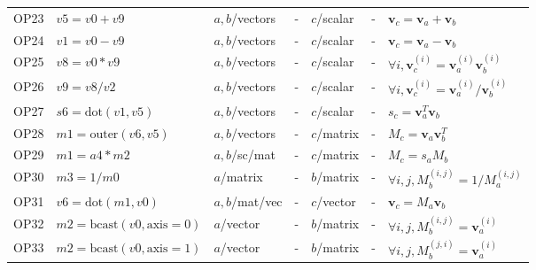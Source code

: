 \documentclass[11pt,oneside,openany,report]{jsbook}
\begin{document}
\begin{center}
{{\begin{longtable}{l|l|lc|lc|l}
        OP23 & $v5 = v0 + v9$                             & $a,b$/vectors           & -               & $c$/scalar & -     & $\bm{v}_c = \bm{v}_a + \bm{v}_b$                                               \\
        OP24 & $v1 = v0 - v9$                             & $a,b$/vectors           & -               & $c$/scalar & -     & $\bm{v}_c = \bm{v}_a - \bm{v}_b$                                               \\
        OP25 & $v8 = v0 * v9$                             & $a,b$/vectors           & -               & $c$/scalar & -     & $\forall i,\bm{v}_c^{(i)} = \bm{v}_a^{(i)} \bm{v}_b^{(i)}$                     \\
        OP26 & $v9 = v8 / v2$                             & $a,b$/vectors           & -               & $c$/scalar & -     & $\forall i,\bm{v}_c^{(i)} = \bm{v}_a^{(i)} / \bm{v}_b^{(i)}$                   \\
        OP27 & $s6 = \mathrm{dot}(v1, v5)$                & $a,b$/vectors           & -               & $c$/scalar & -     & $s_c = \bm{v}_a^T \bm{v}_b$                                                    \\
        OP28 & $m1 = \mathrm{outer}(v6, v5)$              & $a,b$/vectors           & -               & $c$/matrix & -     & $M_c = \bm{v}_a\bm{v}_b^T$                                                     \\
        OP29 & $m1 = a4 * m2$                             & $a,b$/sc/mat            & -               & $c$/matrix & -     & $M_c = s_a M_b$                                                                \\
        OP30 & $m3 = 1/m0$                                & $a$/matrix              & -               & $b$/matrix & -     & $ \forall i,j, M_b^{(i,j)} = 1/M_a^{(i, j)} $                                  \\
        OP31 & $v6 = \mathrm{dot}(m1, v0)$                & $a,b$/mat/vec           & -               & $c$/vector & -     & $\bm{v}_c = M_a \bm{v}_b$                                                      \\
        OP32 & $m2 = \mathrm{bcast}(v0, \mathrm{axis}=0)$ & $a$/vector              & -               & $b$/matrix & -     & $\forall i,j,M_b^{(i,j)}= \bm{v}_a^{(i)}$                                      \\
        OP33 & $m2 = \mathrm{bcast}(v0, \mathrm{axis}=1)$ & $a$/vector              & -               & $b$/matrix & -     & $\forall i,j,M_b^{(j,i)}= \bm{v}_a^{(i)}$                                      \\

\end{longtable}}}
\end{center}
\end{document}
